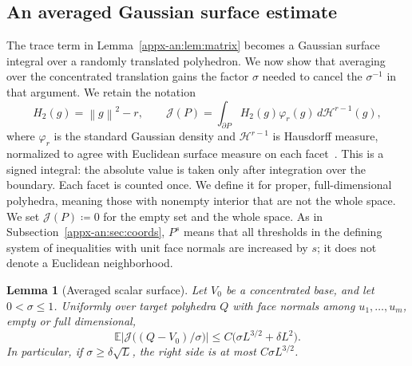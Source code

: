 \documentclass[11pt,letterpaper]{article}
\newtheorem{lemma}{Lemma}
\theoremstyle{remark}
\newcommand{\E}{\mathbb E}
\newcommand{\norm}[1]{\left\lVert#1\right\rVert}
\newcommand{\dd}{\,d}
\newcommand{\surf}{\mathcal J}
\begin{document}
\subsection{An averaged Gaussian surface estimate}
\label{appx-an:sec:surface}

The trace term in Lemma~\ref{appx-an:lem:matrix} becomes a Gaussian
surface integral over a randomly translated polyhedron. We now show
that averaging over the concentrated translation gains the factor
\(\sigma\) needed to cancel the \(\sigma^{-1}\) in that argument.
We retain the notation
\[
 H_2(g)=\norm g^2-r,\qquad
 \surf(P)=\int_{\partial P}H_2(g)\varphi_r(g)\dd\mathcal H^{r-1}(g),
\]
where \(\varphi_r\) is the standard Gaussian density and
\(\mathcal H^{r-1}\) is Hausdorff measure, normalized to agree with
Euclidean surface measure on each facet~\cite[Chapter~2]{EvansGariepy2015}.
This is a signed integral: the absolute value is taken only after
integration over the boundary. Each facet is counted once. We define
it for proper, full-dimensional polyhedra, meaning those with nonempty
interior that are not the whole space.
We set \(\surf(P)\coloneqq 0\) for the empty set and the whole space. As in
Subsection~\ref{appx-an:sec:coords}, \(P^s\) means that all thresholds
in the defining system of inequalities with unit face normals are increased by
\(s\); it does not denote a Euclidean neighborhood.

\begin{lemma}[Averaged scalar surface]\label{appx-an:lem:surface}
Let \(V_0\) be a concentrated base, and let \(0<\sigma\le1\). Uniformly
over target polyhedra \(Q\) with face normals among \(u_1,\ldots,u_m\), empty
or full dimensional,
\begin{equation}
 \E\left|\surf\bigl((Q-V_0)/\sigma\bigr)\right|
 \le C\bigl(\sigma L^{3/2}+\delta L^2\bigr).
 \label{appx-an:surface-bound}
\end{equation}
In particular, if \(\sigma\ge\delta\sqrt L\), the right side is at most
\(C\sigma L^{3/2}\).
\end{lemma}
\end{document}
